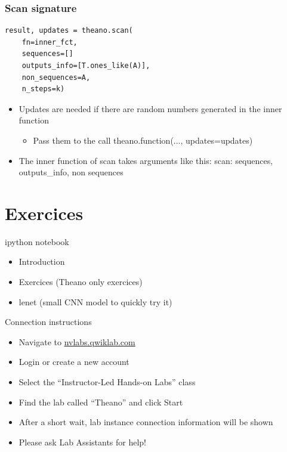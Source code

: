 \documentclass[utf8x,xcolor=pdftex,dvipsnames,table]{beamer}
\begin{document}
\begin{frame}[fragile]
  \frametitle{Scan signature}

\begin{lstlisting}
result, updates = theano.scan(
    fn=inner_fct,
    sequences=[]
    outputs_info=[T.ones_like(A)],
    non_sequences=A,
    n_steps=k)
\end{lstlisting}

\begin{itemize}
\item Updates are needed if there are random numbers generated in the inner function
\begin{itemize}
\item Pass them to the call theano.function(..., updates=updates)
\end{itemize}
\item The inner function of scan takes arguments like this:
   scan: sequences, outputs\_info, non sequences
\end{itemize}

\end{frame}
\fi

\section{Exercices}
\begin{frame}
  \tableofcontents[currentsection]
\end{frame}

\begin{frame}{ipython notebook}
\begin{itemize}
\item Introduction
\item Exercices (Theano only exercices)
\item lenet (small CNN model to quickly try it)
\end{itemize}
\end{frame}


\begin{frame}{Connection instructions}
\begin{itemize}
\item Navigate to \url{nvlabs.qwiklab.com}
\item Login or create a new account
\item Select the ``Instructor-Led Hands-on Labs'' class
\item Find the lab called ``Theano'' and click Start
\item After a short wait, lab instance connection information will be shown
\item Please ask Lab Assistants for help!
\end{itemize}
\end{frame}
\end{document}
